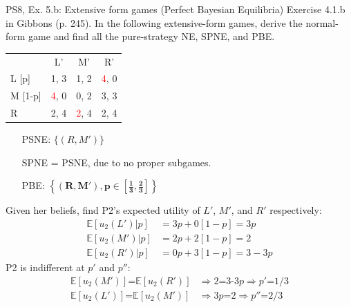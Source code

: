 \begin{frame}{PS8, Ex. 5.b: Extensive form games (Perfect Bayesian Equilibria)}
    Exercise 4.1.b in Gibbons (p. 245). In the following extensive-form games, derive the normal-form game and find all the pure-strategy NE, SPNE, and PBE.
    \vspace{-9pt}
    \begin{multicols}{2}
      \begin{table}
        \begin{tabular}{l|c|c|c|}
          \multicolumn{1}{c}{} & \multicolumn{1}{c}{L'} & \multicolumn{1}{c}{M'} & \multicolumn{1}{c}{R'} \\\cline{2-4}
          L [p]   & 1, \color{blue}3 & 1, 2 & \textcolor{red}{4}, 0 \\\cline{2-4}
          M [1-p] & \textcolor{red}{4}, 0 & 0, 2 & 3, \color{blue}3 \\\cline{2-4}
          R       & 2, \color{blue}4 & \textcolor{red}{2}, \color{blue}4 & 2, \color{blue}4 \\\cline{2-4}
        \end{tabular}
      \end{table} \vspace{-8pt}
      \begin{itemize}
        \item[PSNE:] $\{(R,M')\}$
        \item[SPNE =] PSNE, due to no proper subgames.
        \item[PBE:] $\bm{\left\{(R,M'),p\in\left[\frac{1}{3},\frac{2}{3}\right]\right\}}$
      \end{itemize} \vspace{-6pt}
      Given her beliefs, find P2's expected utility of $L'$, $M'$, and $R'$ respectively: \vspace{-6pt}
      \begin{align*}
        \mathbb{E}[u_2(L')|p]&=3p+0[1-p]=3p\\
        \mathbb{E}[u_2(M')|p]&=2p+2[1-p]=2\\
        \mathbb{E}[u_2(R')|p]&=0p+3[1-p]=3-3p
      \end{align*}
      P2 is indifferent at $p'$ and $p''$: \vspace{-6pt}
      \begin{align*}
        \mathbb{E}[u_2(M')]\text{=}\mathbb{E}[u_2(R')]&\Rightarrow 2\text{=3-3}p\Rightarrow p'\text{=}1/3\\
        \mathbb{E}[u_2(L')]\text{=}\mathbb{E}[u_2(M')]&\Rightarrow 3p\text{=}2\Rightarrow p''\text{=}2/3

\end{align*}
\end{multicols}
\end{frame}
